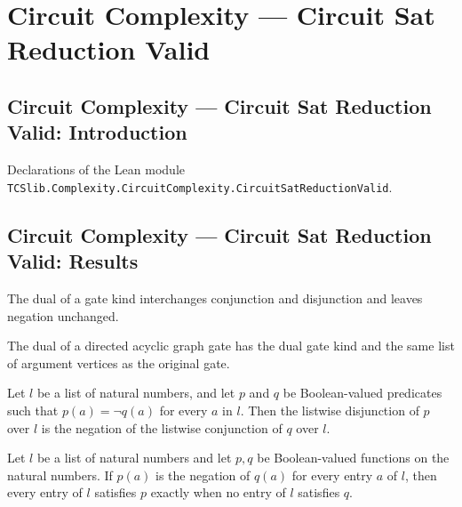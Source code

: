 \section{Circuit Complexity --- Circuit Sat Reduction Valid}
\subsection*{Circuit Complexity --- Circuit Sat Reduction Valid: Introduction}

Declarations of the Lean module \texttt{TCSlib.Complexity.CircuitComplexity.CircuitSatReductionValid}.

\subsection*{Circuit Complexity --- Circuit Sat Reduction Valid: Results}

\begin{definition}
\label{BoolCircuit.GateKind.dual}
\leanok
{}
The dual of a gate kind interchanges conjunction and disjunction and leaves negation
unchanged.
\end{definition}

\begin{definition}
\label{BoolCircuit.DAGGate.dual}
\leanok
{}
The dual of a directed acyclic graph gate has the dual gate kind and the same list of
argument vertices as the original gate.
\end{definition}

\begin{theorem}
\label{BoolCircuit.any_eq_not_all}
\leanok
{}
Let $l$ be a list of natural numbers, and let $p$ and $q$ be Boolean-valued predicates
such that $p(a)=\neg q(a)$ for every $a$ in $l$. Then the listwise disjunction of $p$
over $l$ is the negation of the listwise conjunction of $q$ over $l$.
\end{theorem}

\begin{theorem}
\label{BoolCircuit.all_eq_not_any}
\leanok
{}
Let $l$ be a list of natural numbers and let $p,q$ be Boolean-valued functions on the
natural numbers. If $p(a)$ is the negation of $q(a)$ for every entry $a$ of $l$, then
every entry of $l$ satisfies $p$ exactly when no entry of $l$ satisfies $q$.
\end{theorem}

